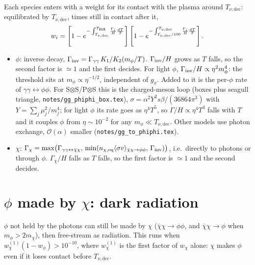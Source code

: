 \documentclass{article}
\newcommand{\Tnu}{T_{\nu,\mathrm{dec}}}
\begin{document}
Each species enters with a weight for its contact with the plasma around $\Tnu$:
equilibrated by $\Tnu$, times still in contact after it,
\begin{equation}
  w_i = \left[1 - e^{-\int_{\Tnu}^{T_{\rm RH}} \frac{\Gamma_i}{H}\frac{dT}{T}}\right]
        \left[1 - e^{-\int_{\Tnu/100}^{\Tnu} \frac{\Gamma_i}{H}\frac{dT}{T}}\right].
\end{equation}
\begin{itemize}
\item $\phi$: inverse decay, $\Gamma_{\rm inv} = \Gamma_{\gamma\gamma}\,K_1/K_2(m_\phi/T)$.
  $\Gamma_{\rm inv}/H$ grows as $T$ falls, so the second factor is $\simeq 1$ and the first
  decides. For light $\phi$, $\Gamma_{\rm inv}/H \propto \eta^2 m_\phi^4$: the threshold sits
  at $m_\phi \propto \eta^{-1/2}$, independent of $g_x$.
  Added to it is the per-$\phi$ rate of $\gamma\gamma\leftrightarrow\phi\phi$. For
  S$\otimes$S/P$\otimes$S this is the charged-meson loop (boxes plus seagull triangle,
  \texttt{notes/gg\_phiphi\_box.tex}), $\sigma=\alpha^2Y^2s\beta/(36864\pi^3)$ with
  $Y=\sum_j\mu_j^2/m_j^4$; for light $\phi$ its rate goes as $\eta^4T^5$, so
  $\Gamma/H\propto\eta^4T^3$ falls with $T$ and it couples $\phi$ from
  $\eta\sim10^{-2}$ for any $m_\phi\ll\Tnu$. Other models use photon exchange,
  $\mathcal O(\alpha)$ smaller (\texttt{notes/gg\_to\_phiphi.tex}).
\item $\chi$: $\Gamma_\chi = \max\!\big(\Gamma_{\gamma\gamma\leftrightarrow\bar\chi\chi},\,
  \min(n_{\chi,\rm eq}\langle\sigma v\rangle_{\bar\chi\chi\to\phi\phi},\,\Gamma_{\rm inv})\big)$,
  i.e.\ directly to photons or through $\phi$. $\Gamma_\chi/H$ falls as $T$ falls, so
  the first factor is $\simeq 1$ and the second decides.
\end{itemize}

\section{$\phi$ made by $\chi$: dark radiation}

$\phi$ not held by the photons can still be made by $\chi$
($\bar\chi\chi\to\phi\phi$, and $\bar\chi\chi\to\phi$ when $m_\phi > 2m_\chi$), then
free-stream as radiation. This runs when $w_\chi^{(1)}(1-w_\phi) > 10^{-10}$, where
$w_\chi^{(1)}$ is the first factor of $w_\chi$ alone: $\chi$ makes $\phi$ even if
it loses contact before $\Tnu$.
\end{document}
